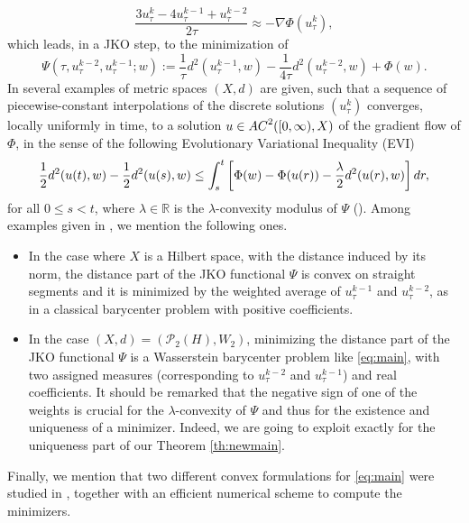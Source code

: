 \documentclass[12pt,a4paper]{article}
\newcommand{\R}{\mathbb{R}}
\renewcommand{\d}{{\rm d}}
\newcommand{\X}{\mathcal{P}_2(H)}
\theoremstyle{plain}
\theoremstyle{definition}
\begin{document}
\[    
	\frac{3u^k_\tau - 4u^{k-1}_\tau +u^{k-2}_\tau}{2\tau} \approx -\nabla \Phi(u^k_\tau),
\]
which leads, in a JKO step, to the minimization of
\[    
	\Psi(\tau,u^{k-2}_\tau, u^{k-1}_\tau;w):= \frac{1}{\tau}d^2(u^{k-1}_\tau,w) -\frac{1}{4\tau}d^2(u^{k-2}_\tau,w) +\Phi(w).
\]
In \cite{matthes-plazotta} several examples of metric spaces $(X,d)$ are given, such that a sequence of piecewise-constant interpolations of the discrete solutions $(u^k_\tau)$ converges, locally uniformly in time, to a solution $u\in {\rm AC}^2([0,\infty),X)$ of the gradient flow of $\Phi$, in the sense of the following Evolutionary Variational Inequality (EVI)
\[
    \frac12d^2(u(t),w)-\frac12d^2(u(s),w) \leq \int_s^t \left[ \Phi(w) -\Phi(u(r)) -\frac{\lambda}{2}d^2(u(r),w)\right]\d r,
\]
for all $0\leq s<t$, where $\lambda \in \R$ is the $\lambda$-convexity modulus of $\Psi$ (\cite[Theorem 5.1]{matthes-plazotta}). Among examples given in \cite{matthes-plazotta}, we mention the following ones.
\begin{itemize}
	\item[(a)] In the case where $X$ is a Hilbert space, with the distance induced by its norm, the distance part of the JKO functional $\Psi$ is convex on straight segments and it is minimized by the weighted average of $u^{k-1}_\tau$ and $u^{k-2}_\tau$, as in a classical barycenter problem with positive coefficients.
	\item[(b)] In the case $(X,d)=(\X,W_2)$, minimizing the distance part of the JKO functional $\Psi$ is a Wasserstein barycenter problem like \eqref{eq:main}, with two assigned measures (corresponding to $u^{k-2}_\tau$ and $u^{k-1}_\tau$) and real coefficients. It should be remarked that the negative sign of one of the weights is crucial for the $\lambda$-convexity of $\Psi$ and thus for the existence and uniqueness of a minimizer. Indeed, we are going to exploit exactly \cite[Theorem 3.4]{matthes-plazotta} for the uniqueness part of our Theorem \ref{th:newmain}. 
\end{itemize}
Finally, we mention that two different convex formulations for \eqref{eq:main} were studied in \cite{gallouet2025}, together with an efficient numerical scheme to compute the minimizers.
\end{document}
